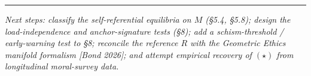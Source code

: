 \documentclass[
]{article}
\begin{document}
\begin{center}\rule{0.5\linewidth}{0.5pt}\end{center}

\emph{Next steps: classify the self-referential equilibria on \(M\)
(§5.4, §5.8); design the load-independence and anchor-signature tests
(§8); add a schism-threshold / early-warning test to §8; reconcile the
reference \(R\) with the Geometric Ethics manifold formalism {[}Bond
2026{]}; and attempt empirical recovery of \((\star)\) from longitudinal
moral-survey data.}
\end{document}

